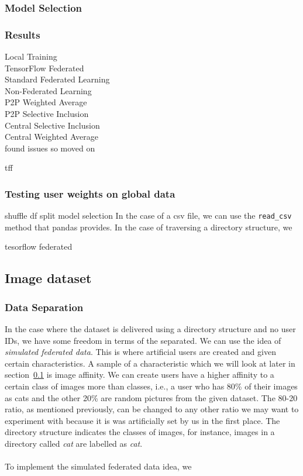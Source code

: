 \documentclass[12pt]{article}
\begin{document}
\subsubsection{Model Selection}
\subsubsection{Results}
Local Training\\
TensorFlow Federated\\
Standard Federated Learning\\
Non-Federated Learning\\
P2P Weighted Average\\
P2P Selective Inclusion\\
Central Selective Inclusion\\
Central Weighted Average\\
found issues so moved on

tff 

\subsubsection{Testing user weights on global data}
shuffle
df split
model selection
In the case of a csv file, we can use the \texttt{read\_csv} method that pandas provides. In the case of traversing a directory structure, we 


 tesorflow federated
\subsection{Image dataset}\label{subsec:imageset}
\subsubsection{Data Separation}
In the case where the dataset is delivered using a directory structure and no user IDs, we have some freedom in terms of the separated. We can use the idea of \textit{simulated federated data}. This is where artificial users are created and given certain characteristics. A sample of a characteristic which we will look at later in section~\ref{subsec:imageset} is image affinity. We can create users have a higher affinity to a certain class of images more than classes, i.e., a user who has 80\% of their images as cats and the other 20\% are random pictures from the given dataset. The 80-20 ratio, as mentioned previously, can be changed to any other ratio we may want to experiment with because it is was artificially set by us in the first place. The directory structure indicates the classes of images, for instance, images in a directory called \textit{cat} are labelled as \textit{cat}.
\\\\
To implement the simulated federated data idea, we 
\end{document}
